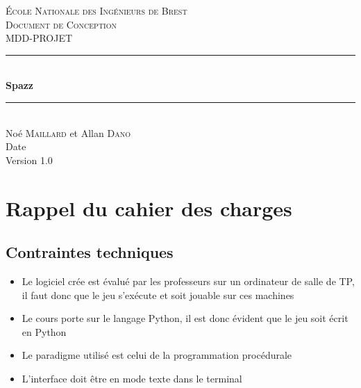 \documentclass[a4paper,11pt]{scrartcl}
\begin{document}
\begin{titlepage}

\newcommand{\HRule}{\rule{\linewidth}{0.5mm}} %

\center %


\textsc{\LARGE École Nationale des Ingénieurs de Brest}\\[1.5cm]
\textsc{\Large Document de Conception}\\[0.5cm]
\textsc{\large MDD-PROJET}\\[0.5cm]


\HRule \\[0.4cm]
{\huge \bfseries Spazz}\\[0.4cm] %
\HRule \\[1.5cm]

\Large
Noé \textsc{Maillard} et Allan \textsc{Dano}\\[3cm]


{Date}\\[3cm] %

{\large Version 1.0}


\vfill

\end{titlepage}

\tableofcontents
\newpage
\section{Rappel du cahier des charges}

\subsection{Contraintes techniques}

\begin{itemize}[label = $\bullet$]
	\item Le logiciel crée est évalué par les professeurs sur un ordinateur de salle de TP, il faut donc que le jeu s’exécute et soit jouable sur ces machines
	\item Le cours porte sur le langage Python, il est donc évident que le jeu soit écrit en Python
	\item Le paradigme utilisé est celui de la programmation procédurale
	\item L'interface doit être en mode texte dans le terminal
\end{itemize}
\end{document}
